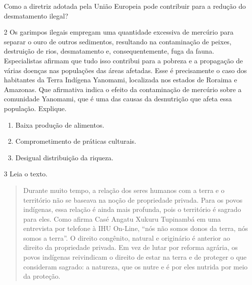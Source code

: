 Como a diretriz adotada pela União Europeia pode contribuir para a
redução do desmatamento ilegal?


\num{2} Os garimpos ilegais empregam uma quantidade excessiva de
mercúrio para separar o ouro de outros sedimentos, resultando na
contaminação de peixes, destruição de rios, desmatamento e,
consequentemente, fuga da fauna. Especialistas afirmam que tudo isso
contribui para a pobreza e a propagação de várias doenças nas populações
das áreas afetadas. Esse é precisamente o caso dos habitantes da Terra
Indígena Yanomami, localizada nos estados de Roraima e Amazonas. Que
afirmativa indica o efeito da contaminação de mercúrio sobre a
comunidade Yanomami, que é uma das causas da desnutrição que afeta essa
população. Explique.

\begin{enumerate}
\item Baixa produção de alimentos.

\item Comprometimento de práticas culturais.

\item Desigual distribuição da riqueza.
\end{enumerate}


\num{3} Leia o texto.

\begin{quote}
Durante muito tempo, a relação dos seres humanos com a terra e o
território não se baseava na noção de propriedade privada. Para os povos
indígenas, essa relação é ainda mais profunda, pois o território é
sagrado para eles. Como afirma Casé Angatu Xukuru Tupinambá em uma
entrevista por telefone à IHU On-Line, ``nós não somos donos da terra,
nós somos a terra''. O direito congênito, natural e originário é
anterior ao direito da propriedade privada. Em vez de lutar por reforma
agrária, os povos indígenas reivindicam o direito de estar na terra e de
proteger o que consideram sagrado: a natureza, que os nutre e é por eles
nutrida por meio da proteção.

\end{quote}

